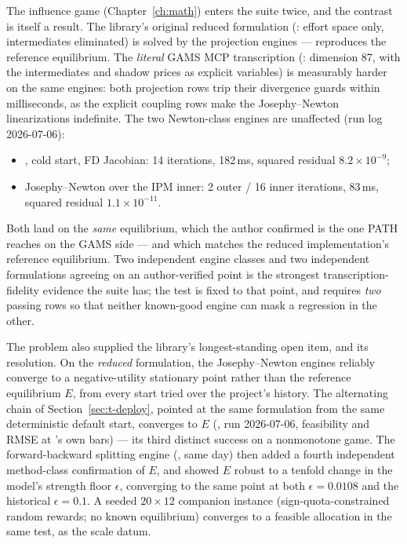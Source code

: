 The influence game (Chapter~\ref{ch:math}) enters the suite twice, and the
contrast is itself a result. The library's original reduced formulation
(: effort space only, intermediates eliminated) is solved by
the projection engines ---  reproduces the reference
equilibrium. The \emph{literal} GAMS MCP transcription
(: dimension 87, with the intermediates and
shadow prices as explicit variables) is measurably harder on the same
engines: both projection rows trip their divergence guards within
milliseconds, as the explicit coupling rows make the Josephy--Newton
linearizations indefinite. The two Newton-class engines are unaffected
(run log 2026-07-06):

\begin{itemize}
\item {}, cold start, FD Jacobian:
  14 iterations, 182\,ms, squared residual $8.2\times 10^{-9}$;
\item Josephy--Newton over the IPM inner: 2 outer / 16 inner
  iterations, 83\,ms, squared residual $1.1\times 10^{-11}$.
\end{itemize}

Both land on the \emph{same} equilibrium, which the author confirmed is
the one PATH reaches on the GAMS side --- and which matches the reduced
implementation's reference equilibrium. Two independent engine classes and
two independent formulations agreeing on an author-verified point is the
strongest transcription-fidelity evidence the suite has; the test is fixed
to that point, and requires \emph{two} passing rows so that neither
known-good engine can mask a regression in the other.

The problem also supplied the library's longest-standing open item, and
its resolution. On the \emph{reduced} formulation, the Josephy--Newton
engines reliably converge to a negative-utility stationary point rather
than the reference equilibrium $E$, from every start tried over the
project's history. The alternating chain of Section~\ref{sec:t-deploy},
pointed at the same formulation from the same deterministic default start,
converges to $E$ (, run 2026-07-06, feasibility
and RMSE at 's own bars) --- its third distinct success
on a nonmonotone game. The forward-backward splitting engine
(, same day) then added a fourth independent
method-class confirmation of $E$, and showed $E$ robust to a tenfold
change in the model's strength floor $\epsilon$, converging to the same
point at both $\epsilon = 0.0108$ and the historical $\epsilon = 0.1$. A
seeded $20 \times 12$ companion instance (sign-quota-constrained random
rewards; no known equilibrium) converges to a feasible allocation in the
same test, as the scale datum.

